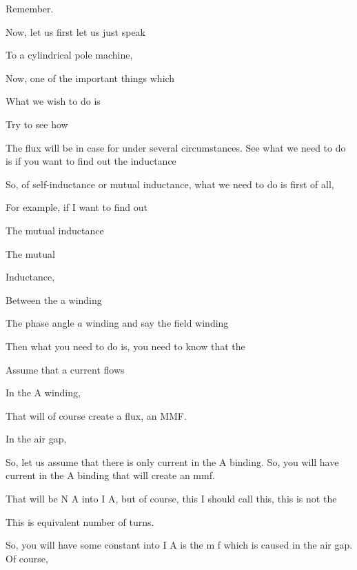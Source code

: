 \documentclass{article}
\begin{document}
Remember.

Now, let us first let us just speak

To a cylindrical pole machine,

Now, one of the important things which

What we wish to do is

Try to see how

The flux will be in case for under several circumstances. See what we need to do is if you want to find out the inductance

So, of self-inductance or mutual inductance, what we need to do is first of all,

For example, if I want to find out

The mutual inductance







The mutual

Inductance,





Between the a winding

The phase angle $a$ winding and say the field winding

Then what you need to do is, you need to know that the

Assume that a current flows

In the A winding,

That will of course create a flux, an MMF.

In the air gap,

So, let us assume that there is only current in the A binding. So, you will have current in the A binding that will create an mmf.

That will be N A into I A, but of course, this I should call this, this is not the

This is equivalent number of turns.

So, you will have some constant into I A is the m f which is caused in the air gap. Of course,
\end{document}
